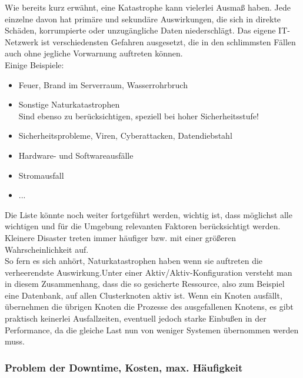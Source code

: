 \documentclass[letterpaper, 12pt]{article}
\let\tempsubsubsection\subsubsection
\renewcommand\subsubsection[1]{\vspace{0cm}\tempsubsubsection{#1}\vspace{0cm}}
\begin{document}
Wie bereits kurz erwähnt, eine Katastrophe kann vielerlei Ausmaß haben. Jede einzelne davon hat primäre und sekundäre Auswirkungen, die sich in direkte Schäden, korrumpierte oder unzugängliche Daten niederschlägt. Das eigene IT-Netzwerk ist verschiedensten Gefahren ausgesetzt, die in den schlimmsten Fällen auch ohne jegliche Vorwarnung auftreten können. \\
Einige Beispiele:

\begin{itemize}
	\item Feuer, Brand im Serverraum, Wasserrohrbruch
	\item Sonstige Naturkatastrophen \\ Sind ebenso zu berücksichtigen, speziell bei hoher Sicherheitsstufe!
	\item Sicherheitsprobleme, Viren, Cyberattacken, Datendiebstahl
	\item Hardware- und Softwareausfälle
	\item Stromausfall
	\item ...
\end{itemize}

Die Liste könnte noch weiter fortgeführt werden, wichtig ist, dass möglichst alle wichtigen und für die Umgebung relevanten Faktoren berücksichtigt werden. Kleinere Disaster treten immer häufiger bzw. mit einer größeren Wahrscheinlichkeit auf. \\
So fern es sich anhört, Naturkatastrophen haben wenn sie auftreten die verheerendste Auswirkung.Unter einer Aktiv/Aktiv-Konfiguration versteht man in diesem Zusammenhang, dass die so gesicherte Ressource, also zum Beispiel eine Datenbank, auf allen Clusterknoten aktiv ist. Wenn ein Knoten ausfällt, übernehmen die übrigen Knoten die Prozesse des ausgefallenen Knotens, es gibt praktisch keinerlei Ausfallzeiten, eventuell jedoch starke Einbußen in der Performance, da die gleiche Last nun von weniger Systemen übernommen werden muss.

\subsubsection{Problem der Downtime, Kosten, max. Häufigkeit}
\end{document}
